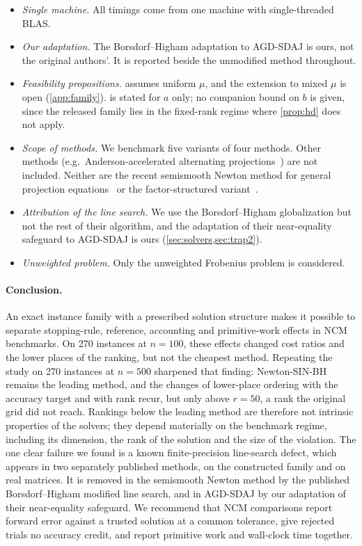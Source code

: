 \begin{itemize}
    reuse of each drawn $U$ across all cells of its rank makes instance-level
    comparisons strongly dependent.
  \item \emph{Single machine.} All timings come from one machine with
    single-threaded BLAS.
  \item \emph{Our adaptation.} The Borsdorf--Higham adaptation to AGD-SDAJ is
    ours, not the original authors'. It is reported beside the unmodified
    method throughout.
  \item \emph{Feasibility propositions.}  assumes uniform
    $\mu$, and the extension to mixed $\mu$ is open (\cref{app:family}).
     is stated for $a$ only; no companion bound on $b$ is
    given, since the released family lies in the fixed-rank regime where
    \cref{prop:hd} does not apply.
  \item \emph{Scope of methods.} We benchmark five variants of four methods.
    Other methods (e.g.\ Anderson-accelerated alternating
    projections~\cite{higham2016anderson}) are not included.
    Neither are the recent semismooth Newton method for general projection
    equations~\cite{armijo2025semismooth} or the factor-structured
    variant~\cite{borsdorf2010factor}.
  \item \emph{Attribution of the line search.} We use the Borsdorf--Higham
    globalization but not the rest of their algorithm, and the adaptation of
    their near-equality safeguard to AGD-SDAJ is ours
    (\cref{sec:solvers,sec:trap2}).
  \item \emph{Unweighted problem.} Only the unweighted Frobenius problem is
    considered.
\end{itemize}

\paragraph{Conclusion.}
An exact instance family with a prescribed solution structure makes it
possible to separate stopping-rule, reference, accounting and
primitive-work effects in NCM benchmarks. On 270 instances at $n=100$, these
effects changed cost ratios and the lower places of the ranking, but not the
cheapest method. Repeating the study on 270 instances at $n=500$ sharpened
that finding: Newton-SIN-BH remains the leading method, and the changes of
lower-place ordering with the accuracy target and with rank recur, but only
above $r=50$, a rank the original grid did not reach. Rankings
below the leading method are therefore not intrinsic properties of the
solvers; they depend materially on the benchmark regime, including its
dimension, the rank of the solution and the size of the violation. The one clear failure we found is a known finite-precision
line-search defect, which appears in two separately published methods, on
the constructed family and on real matrices. It is
removed in the semismooth Newton method by the published Borsdorf--Higham
modified line search, and in AGD-SDAJ by our adaptation of their near-equality
safeguard. We recommend
that NCM comparisons report forward error against a trusted solution at a
common tolerance, give rejected trials no accuracy credit, and report
primitive work and wall-clock time together.
